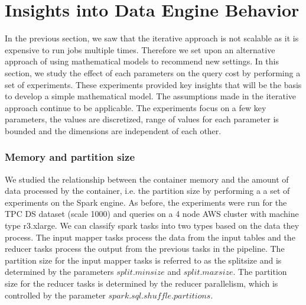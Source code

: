 \section{Insights into Data Engine Behavior}
\label{sec:insights}
In the previous section, we saw that the iterative approach is not scalable as it is expensive to run jobs multiple times. Therefore we set upon an alternative approach of using mathematical models to recommend new settings. In this section, we study the effect of each parameters on the query cost by performing a set of experiments. These experiments provided key insights that will be the basis to develop a simple mathematical model. 
The assumptions made in the iterative approach continue to be applicable. The experiments focus on a few key parameters, the values are discretized, range of values for each parameter is bounded and the dimensions are independent of each other. 



\subsubsection*{Memory and partition size}
We studied the relationship between the container memory and the amount of data processed by the container, i.e. the partition size by performing a a set of experiments on the Spark engine. As before, the experiments were run for the TPC DS dataset (scale 1000) and queries on a 4 node AWS cluster with machine type r3.xlarge. We can classify spark tasks into two types based on the data they process. The input mapper tasks process the data from the input tables and the reducer tasks process the output from the previous tasks in the pipeline. The partition size for the input mapper tasks is referred to as the splitsize and is determined by the parameters %
$split.minsize$ and %
$split.maxsize$. The partition size for the reducer tasks is determined by the reducer parallelism, which is controlled by the parameter $spark.sql.shuffle.partitions$. 

